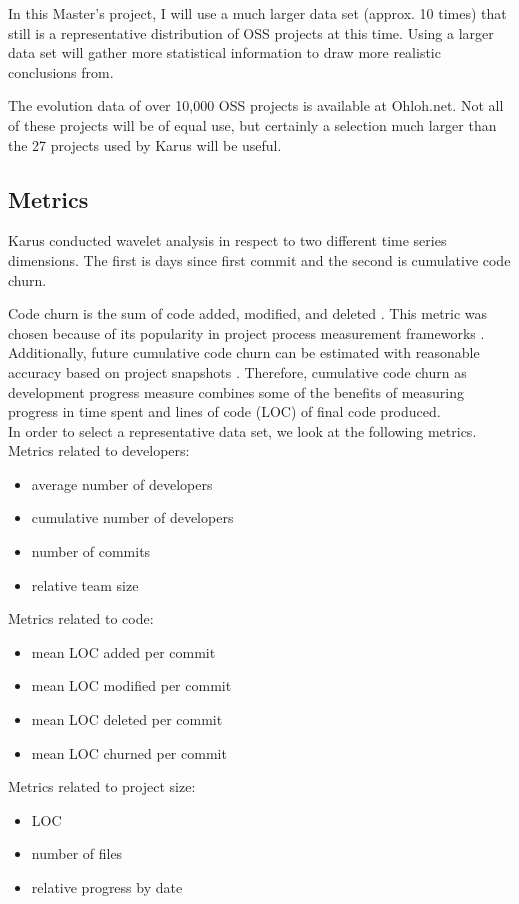 In this Master's project, I will use a much larger data set (approx. 10
times) that still is a representative distribution of OSS projects at this time.
Using a larger data set will gather more statistical information to draw more
realistic conclusions from.

The evolution data of over 10,000 OSS projects is available at Ohloh.net. Not
all of these projects will be of equal use, but certainly a selection much
larger than the 27 projects used by Karus will be useful.

\subsection{Metrics}
Karus conducted wavelet analysis in respect to two different time series
dimensions. The first is days since first commit and the second is cumulative
code churn.

Code churn is the sum of code added, modified, and deleted \cite{elbaum}. This
metric was chosen because of its popularity in project process measurement
frameworks \cite{karus2013}. Additionally, future cumulative code churn can be
estimated with reasonable accuracy based on project snapshots \cite{dumas}.
Therefore, cumulative code churn as development progress measure combines some
of the benefits of measuring progress in time spent and lines of code (LOC) of
final code produced.
\\

\noindent
In order to select a representative data set, we look at the following metrics.
\\Metrics related to developers:
\begin{itemize}
	\item average number of developers
	\item cumulative number of developers
	\item number of commits
	\item relative team size
\end{itemize}
Metrics related to code:
\begin{itemize}
	\item mean LOC added per commit
	\item mean LOC modified per commit
	\item mean LOC deleted per commit
	\item mean LOC churned per commit
\end{itemize}
Metrics related to project size:
\begin{itemize}
	\item LOC
	\item number of files
	\item relative progress by date
\end{itemize}


